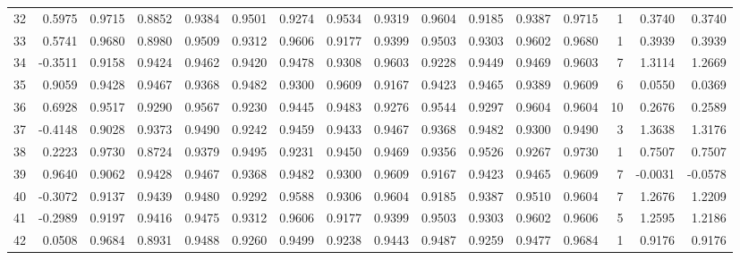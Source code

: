 \begin{tabular}{lrrrrrrrrrrrrrrr}
32  &      0.5975 &  0.9715 &  0.8852 &  0.9384 &  0.9501 &  0.9274 &  0.9534 &  0.9319 &  0.9604 &  0.9185 &   0.9387 &     0.9715 &      1 &                    0.3740 &                     0.3740 \\
33  &      0.5741 &  0.9680 &  0.8980 &  0.9509 &  0.9312 &  0.9606 &  0.9177 &  0.9399 &  0.9503 &  0.9303 &   0.9602 &     0.9680 &      1 &                    0.3939 &                     0.3939 \\
34  &     -0.3511 &  0.9158 &  0.9424 &  0.9462 &  0.9420 &  0.9478 &  0.9308 &  0.9603 &  0.9228 &  0.9449 &   0.9469 &     0.9603 &      7 &                    1.3114 &                     1.2669 \\
35  &      0.9059 &  0.9428 &  0.9467 &  0.9368 &  0.9482 &  0.9300 &  0.9609 &  0.9167 &  0.9423 &  0.9465 &   0.9389 &     0.9609 &      6 &                    0.0550 &                     0.0369 \\
36  &      0.6928 &  0.9517 &  0.9290 &  0.9567 &  0.9230 &  0.9445 &  0.9483 &  0.9276 &  0.9544 &  0.9297 &   0.9604 &     0.9604 &     10 &                    0.2676 &                     0.2589 \\
37  &     -0.4148 &  0.9028 &  0.9373 &  0.9490 &  0.9242 &  0.9459 &  0.9433 &  0.9467 &  0.9368 &  0.9482 &   0.9300 &     0.9490 &      3 &                    1.3638 &                     1.3176 \\
38  &      0.2223 &  0.9730 &  0.8724 &  0.9379 &  0.9495 &  0.9231 &  0.9450 &  0.9469 &  0.9356 &  0.9526 &   0.9267 &     0.9730 &      1 &                    0.7507 &                     0.7507 \\
39  &      0.9640 &  0.9062 &  0.9428 &  0.9467 &  0.9368 &  0.9482 &  0.9300 &  0.9609 &  0.9167 &  0.9423 &   0.9465 &     0.9609 &      7 &                   -0.0031 &                    -0.0578 \\
40  &     -0.3072 &  0.9137 &  0.9439 &  0.9480 &  0.9292 &  0.9588 &  0.9306 &  0.9604 &  0.9185 &  0.9387 &   0.9510 &     0.9604 &      7 &                    1.2676 &                     1.2209 \\
41  &     -0.2989 &  0.9197 &  0.9416 &  0.9475 &  0.9312 &  0.9606 &  0.9177 &  0.9399 &  0.9503 &  0.9303 &   0.9602 &     0.9606 &      5 &                    1.2595 &                     1.2186 \\
42  &      0.0508 &  0.9684 &  0.8931 &  0.9488 &  0.9260 &  0.9499 &  0.9238 &  0.9443 &  0.9487 &  0.9259 &   0.9477 &     0.9684 &      1 &                    0.9176 &                     0.9176 \\

\end{tabular}
